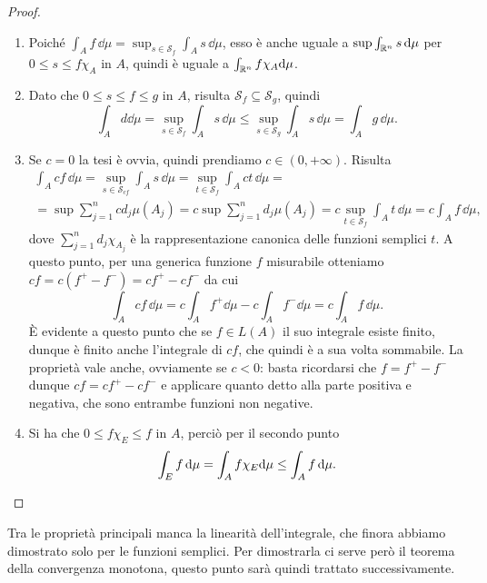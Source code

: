 \begin{proof}
	\begin{enumerate}
		\item Poich\'e $\int_Af\,\dd\mu=\sup_{s\in\mathcal S_f}\int_As\,\dd\mu$, esso è anche uguale a $\sup\int_{\mathbb{R}^n}s\,\textup{d}\mu$ per $0\leq s\leq f\chi_A$ in $A$, quindi è uguale a $\int_{\mathbb{R}^n}f\chi_A\textup{d}\mu$.
		\item Dato che $0\leq s\leq f\leq g$ in $A$, risulta $\mathcal S_f\subseteq\mathcal S_g$, quindi
			\begin{equation}
				\int_Ad\dd\mu=\sup_{s\in\mathcal S_f}\int_As\,\dd\mu\leq\sup_{s\in\mathcal S_g}\int_As\,\dd\mu=\int_Ag\,\dd\mu.
			\end{equation}
		\item Se $c=0$ la tesi è ovvia, quindi prendiamo $c\in(0,+\infty)$.
			Risulta
			\begin{multline}
				\int_Acf\,\dd\mu=\sup_{s\in\mathcal S_{cf}}\int_As\,\dd\mu=\sup_{t\in\mathcal S_f}\int_Act\,\dd\mu=\\
				=\sup\sum_{j=1}^ncd_j\mu(A_j)=c\sup\sum_{j=1}^nd_j\mu(A_j)=c\sup_{t\in\mathcal S_f}\int_At\,\dd\mu=c\int_Af\,\dd\mu,
			\end{multline}
			dove $\sum_{j=1}^nd_j\chi_{A_j}$ è la rappresentazione canonica delle funzioni semplici $t$.
			A questo punto, per una generica funzione $f$ misurabile otteniamo $cf=c(f^+-f^-)=cf^+-cf^-$ da cui
			\begin{equation}
				\int_Acf\,\dd\mu=c\int_Af^+\dd\mu-c\int_Af^-\dd\mu=c\int_Af\,\dd\mu.
			\end{equation}
			È evidente a questo punto che se $f\in L(A)$ il suo integrale esiste finito, dunque è finito anche l'integrale di $cf$, che quindi è a sua volta sommabile.
			La proprietà vale anche, ovviamente se $c<0$: basta ricordarsi che $f=f^+-f^-$ dunque $cf=cf^+-cf^-$ e applicare quanto detto alla parte positiva e negativa, che sono entrambe funzioni non negative.
		\item Si ha che $0\leq f\chi_E\leq f$ in $A$, perciò per il secondo punto
			\begin{equation}
				\int_Ef\,\textup{d}\mu=\int_Af\chi_E\textup{d}\mu\leq \int_Af\,\textup{d}\mu.\qedhere
			\end{equation}
	\end{enumerate}
\end{proof}
Tra le proprietà principali manca la linearità dell'integrale, che finora abbiamo dimostrato solo per le funzioni semplici.
Per dimostrarla ci serve però il teorema della convergenza monotona, questo punto sarà quindi trattato successivamente.

